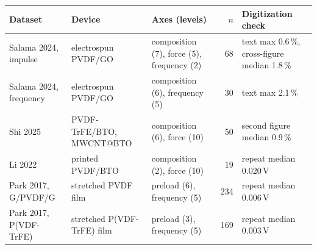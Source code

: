 \begin{tabular}{l l l r l}
\toprule
Dataset & Device & Axes (levels) & $n$ & Digitization check \\
\midrule
Salama 2024, impulse & electrospun PVDF/GO & composition (7), force (5), frequency (2) & 68 & text max 0.6\,\%, cross-figure median 1.8\,\% \\
Salama 2024, frequency & electrospun PVDF/GO & composition (6), frequency (5) & 30 & text max 2.1\,\% \\
Shi 2025 & PVDF-TrFE/BTO, MWCNT@BTO & composition (6), force (10) & 50 & second figure median 0.9\,\% \\
Li 2022 & printed PVDF/BTO & composition (2), force (10) & 19 & repeat median 0.020\,V \\
Park 2017, G/PVDF/G & stretched PVDF film & preload (6), frequency (5) & 234 & repeat median 0.006\,V \\
Park 2017, P(VDF-TrFE) & stretched P(VDF-TrFE) film & preload (3), frequency (5) & 169 & repeat median 0.003\,V \\
\bottomrule
\end{tabular}
